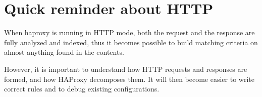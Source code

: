 
\chapter{Quick reminder about HTTP}

When haproxy is running in HTTP mode, both the request and the response are
fully analyzed and indexed, thus it becomes possible to build matching criteria
on almost anything found in the contents.


However, it is important to understand how HTTP requests and responses are
formed, and how HAProxy decomposes them. It will then become easier to write
correct rules and to debug existing configurations.

